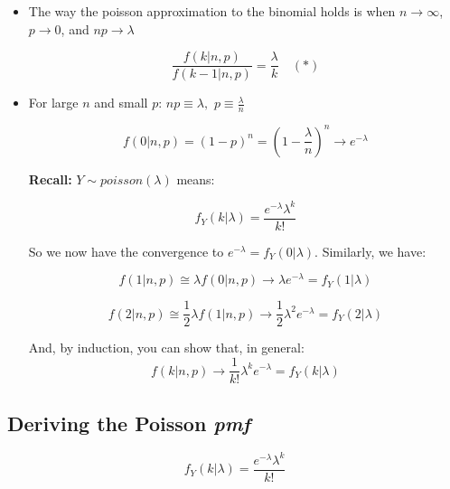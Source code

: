 \documentclass{article}
\begin{document}
\begin{itemize}
    \item The way the poisson approximation to the binomial holds is when $n \to \infty$, $p \to 0$, and $np \to \lambda$
    
    \begin{equation*}
        \frac{f(k|n,p)}{f(k-1|n,p)} = \frac{\lambda}{k} \quad (*)
    \end{equation*}
    
    \item For large $n$ and small $p$: $np \equiv \lambda,$ $p \equiv \frac{\lambda}{n}$
    
    \begin{equation*}
        f(0 | n,p) = (1-p)^n = \left(1-\frac{\lambda}{n}\right)^n \to e^{-\lambda}
    \end{equation*}
    
    \textbf{Recall:} $Y \sim poisson(\lambda)$ means:
    
    \begin{equation*}
        f_Y(k|\lambda) = \frac{e^{-\lambda}\lambda^k}{k!}
    \end{equation*}
    
    So we now have the convergence to $e^{-\lambda} = f_Y(0|\lambda)$. Similarly, we have:
    
    \begin{equation*}
        f(1 | n,p) \cong \lambda f(0|n,p) \to \lambda e^{-\lambda} = f_Y(1|\lambda)
    \end{equation*}
    
    \begin{equation*}
        f(2|n,p) \cong \frac{1}{2}\lambda f(1|n,p) \to \frac{1}{2} \lambda^2 e^{-\lambda} = f_Y(2|\lambda)
    \end{equation*}
    
    And, by induction, you can show that, in general:
    \begin{equation*}
        f(k|n,p) \to \frac{1}{k!} \lambda^k e^{-\lambda} = f_Y(k|\lambda)
    \end{equation*}
    
\end{itemize}


\subsection{Deriving the Poisson \textit{pmf}}
\begin{equation*}
    f_Y(k|\lambda) = \frac{e^{-\lambda}\lambda^k}{k!}
\end{equation*}
\end{document}
